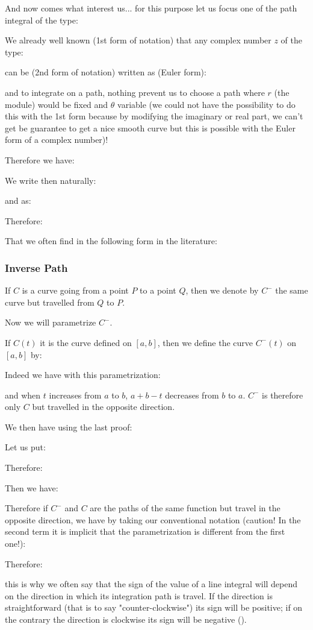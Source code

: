 	And now comes what interest us... for this purpose let us focus one of the path integral of the type:
	
	We already well known (1st form of notation) that any complex number $z$ of the type:
	
	can be (2nd form of notation) written as (Euler form):
	
	and to integrate on a path, nothing prevent us to choose a path where $r$ (the module) would be fixed and $\theta$ variable (we could not have the possibility to do this with the 1st form because by modifying the imaginary or real part, we can't get be guarantee to get a nice smooth curve but this is possible with the Euler form of a complex number)!
	
	Therefore we have:
	
	We write then naturally:
	
	and as:
	
	Therefore:
	
	That we often find in the following form in the literature:
	
	
	
	\subsubsection{Inverse Path}
	If $C$ is a curve going from a point $P$ to a point $Q$, then we denote by $C^-$ the same curve but travelled from $Q$ to $P$.
	
	Now we will parametrize $C^-$.
	
	If $C(t)$ it is the curve defined on $[a, b]$, then we define the curve $C^-(t)$ on $[a, b]$ by:
	
	Indeed we have with this parametrization:
	
	and when $t$ increases from $a$ to $b$, $a + b - t$ decreases from $b$ to $a$. $C^-$ is therefore only $C$ but travelled in the opposite direction.
	
	We then have using the last proof:
	
	Let us put:
	
	Therefore:
	
	Then we have:
	
	Therefore if $C^-$ and $C$ are the paths of the same function but travel in the opposite direction, we have by taking our conventional notation (caution! In the second term it is implicit that the parametrization is different from the first one!):
	
	Therefore:
	
	this is why we often say that the sign of the value of a line integral will depend on the direction in which its integration path is travel. If the direction is straightforward (that is to say "counter-clockwise") its sign will be positive; if on the contrary the direction is clockwise its sign will be negative ().
	
